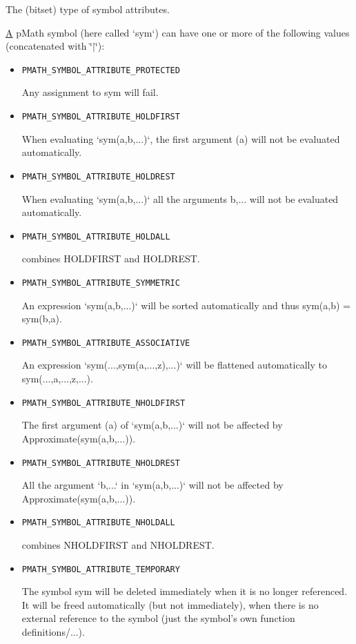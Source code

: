 The (bitset) type of symbol attributes. 

\hyperlink{class_a}{A} pMath symbol (here called `sym`) can have one or more of the following values (concatenated with \char`\"{}$|$\char`\"{}): \begin{itemize}
\item {\tt PMATH\_\-SYMBOL\_\-ATTRIBUTE\_\-PROTECTED} \par
 Any assignment to sym will fail.

\item {\tt PMATH\_\-SYMBOL\_\-ATTRIBUTE\_\-HOLDFIRST} \par
 When evaluating `sym(a,b,...)`, the first argument (a) will not be evaluated automatically.

\item {\tt PMATH\_\-SYMBOL\_\-ATTRIBUTE\_\-HOLDREST} \par
 When evaluating `sym(a,b,...)` all the arguments b,... will not be evaluated automatically.

\item {\tt PMATH\_\-SYMBOL\_\-ATTRIBUTE\_\-HOLDALL} \par
 combines HOLDFIRST and HOLDREST.

\item {\tt PMATH\_\-SYMBOL\_\-ATTRIBUTE\_\-SYMMETRIC} \par
 An expression `sym(a,b,...)` will be sorted automatically and thus sym(a,b) = sym(b,a).

\item {\tt PMATH\_\-SYMBOL\_\-ATTRIBUTE\_\-ASSOCIATIVE} \par
 An expression `sym(...,sym(a,...,z),...)` will be flattened automatically to sym(...,a,...,z,...).

\item {\tt PMATH\_\-SYMBOL\_\-ATTRIBUTE\_\-NHOLDFIRST} \par
 The first argument (a) of `sym(a,b,...)` will not be affected by Approximate(sym(a,b,...)).

\item {\tt PMATH\_\-SYMBOL\_\-ATTRIBUTE\_\-NHOLDREST} \par
 All the argument `b,...` in `sym(a,b,...)` will not be affected by Approximate(sym(a,b,...)).

\item {\tt PMATH\_\-SYMBOL\_\-ATTRIBUTE\_\-NHOLDALL} \par
 combines NHOLDFIRST and NHOLDREST.

\item {\tt PMATH\_\-SYMBOL\_\-ATTRIBUTE\_\-TEMPORARY} \par
 The symbol sym will be deleted immediately when it is no longer referenced. It will be freed automatically (but not immediately), when there is no external reference to the symbol (just the symbol's own function definitions/...).


\end{itemize}
